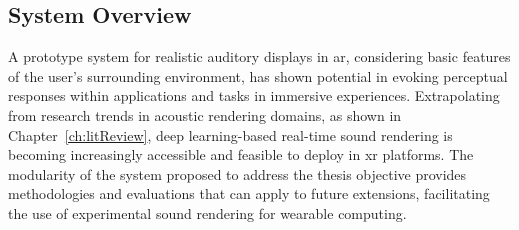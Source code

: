 
\subsection{System Overview}
A prototype system for realistic auditory displays in \acrshort{ar}, considering basic features of the user's surrounding environment, has shown potential in evoking perceptual responses within applications and tasks in immersive experiences. Extrapolating from research trends in acoustic rendering domains, as shown in Chapter~\ref{ch:litReview}, deep learning-based real-time sound rendering is becoming increasingly accessible and feasible to deploy in \acrshort{xr} platforms. The modularity of the system proposed to address the thesis objective provides methodologies and evaluations that can apply to future extensions, facilitating the use of experimental sound rendering for wearable computing.

